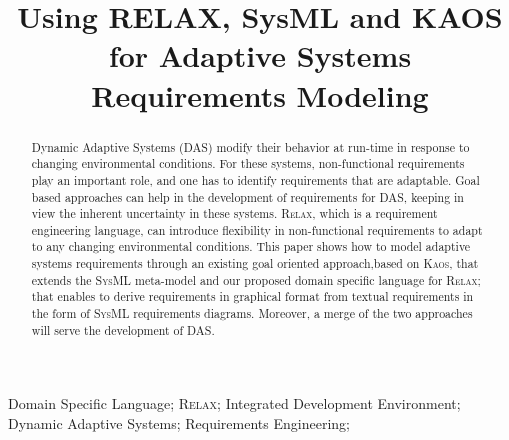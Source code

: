 \documentclass[10pt, conference, compsocconf]{IEEEtran}
\def\myrelax{\textsc{Relax}}                  %
\def\sysml{\textsc{SysML}}
\def\kaos{\textsc{Kaos}}
\begin{document}
%
\title{Using RELAX, SysML and KAOS for Adaptive Systems Requirements Modeling}



\author{
\and
{}
}

\maketitle

\begin{abstract}
Dynamic Adaptive Systems (DAS) modify their behavior at run-time in response to 
changing environmental conditions. For these systems, non-functional requirements play an 
important role, and one has to identify requirements that are adaptable.  Goal based approaches can help in the development of requirements for DAS, keeping in view the inherent uncertainty in these systems. \myrelax{}, which is a requirement engineering language, can introduce flexibility in non-functional requirements to adapt to any changing environmental conditions. 
This paper shows how to model adaptive systems requirements through an existing goal 
oriented approach,based on \kaos{}, that extends the \sysml{} meta-model and our proposed domain 
specific language for \myrelax{}; that enables to derive requirements in graphical 
format from textual requirements in the form of \sysml{} requirements diagrams. 
Moreover, a merge of the two approaches will serve the development of DAS.
\end{abstract}

\begin{IEEEkeywords}
Domain Specific Language; \myrelax{}; Integrated Development Environment; Dynamic Adaptive Systems; Requirements Engineering;

\end{IEEEkeywords}
\end{document}
